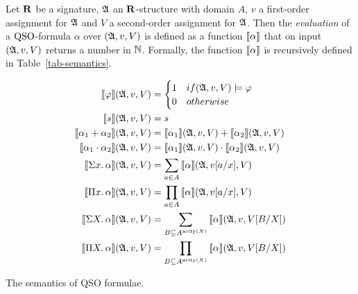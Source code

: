 Let $\mathbf{R}$ be a signature, $\mathfrak{A}$ an $\mathbf{R}$-structure with domain $A$, $v$ a first-order assignment for $\mathfrak{A}$ and $V$ a second-order assignment for $\mathfrak{A}$. Then the \emph{evaluation} of a ${\rm QSO}$-formula $\alpha$ over $(\mathfrak{A}, v, V)$ is defined as a function ${\llbracket{}{\alpha}\rrbracket}$ that on input $(\mathfrak{A}, v, V)$ returns a number in $\mathbb{N}$. Formally, the function ${\llbracket{}{\alpha}\rrbracket}$ is recursively defined in Table~\ref{tab-semantics}.
\begin{table}
	\addtolength{\jot}{0.5em}
	\begin{align*}
	{\llbracket{}{\varphi}\rrbracket}(\mathfrak{A}, v, V) & = 
	\begin{cases}
	1 & \relax{if } (\mathfrak{A}, v, V) \models \varphi \\
	0 & \relax{otherwise}
	\end{cases}\\
	{\llbracket{}{s}\rrbracket}(\mathfrak{A}, v, V) & = s \\
	{\llbracket{}{\alpha_1 +\alpha_2}\rrbracket}(\mathfrak{A}, v, V) & = {\llbracket{}{\alpha_1}\rrbracket}(\mathfrak{A}, v, V) + {\llbracket{}{\alpha_2}\rrbracket}(\mathfrak{A}, v, V)\\
	{\llbracket{}{\alpha_1 \cdot\alpha_2}\rrbracket}(\mathfrak{A}, v, V) & = {\llbracket{}{\alpha_1}\rrbracket}(\mathfrak{A}, v, V) \cdot {\llbracket{}{\alpha_2}\rrbracket}(\mathfrak{A}, v, V)\\ 
	{\llbracket{}{\Sigma{x}.\, \alpha}\rrbracket}(\mathfrak{A}, v, V) & = \displaystyle \sum_{a \in A} {\llbracket{}{\alpha}\rrbracket}(\mathfrak{A},v[a/x],V)\\
	{\llbracket{}{\Pi{x}.\, \alpha}\rrbracket}(\mathfrak{A}, v, V) & = \displaystyle \prod_{a \in A} {\llbracket{}{\alpha}\rrbracket}(\mathfrak{A},v[a/x],V)\\
	{\llbracket{}{\Sigma{X}.\, \alpha}\rrbracket}(\mathfrak{A}, v, V) & = \displaystyle \sum_{B \subseteq A^{{\rm arity}(X)}} {\llbracket{}{\alpha}\rrbracket}(\mathfrak{A}, v, V[B/X])\\
	{\llbracket{}{\Pi{X}.\, \alpha}\rrbracket}(\mathfrak{A}, v, V) & = \displaystyle \prod_{B \subseteq A^{{\rm arity}(X)}} {\llbracket{}{\alpha}\rrbracket}(\mathfrak{A}, v, V[B/X])
	\end{align*}
	\caption{The semantics of QSO formulae.}
	\label{tab-semantics}
	\vspace*{-21pt}
\end{table}
